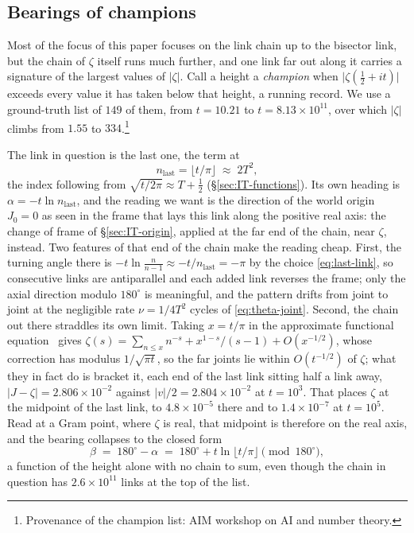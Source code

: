 \documentclass[11pt]{article}
\theoremstyle{definition}
\begin{document}
\subsection{Bearings of champions}\label{sec:champion-bearings}

Most of the focus of this paper focuses on the link chain up to the bisector link, but the chain of $\zeta$ itself runs
much further, and one link far out along it carries a signature of the largest
values of $|\zeta|$. Call a height a \emph{champion} when
$\bigl|\zeta(\tfrac12+it)\bigr|$ exceeds every value it has taken below that
height, a running record. We use a ground-truth list of $149$ of them, from
$t=10.21$ to $t=8.13\times10^{11}$, over which $|\zeta|$ climbs from $1.55$ to
$334$.\footnote{Provenance of the champion list: AIM workshop on AI and
number theory.}

The link in question is the last one, the term at
\begin{equation}\label{eq:last-link}
n_{\text{last}}=\lfloor t/\pi\rfloor\;\approx\;2T^{2},
\end{equation}
the index following from $\sqrt{t/2\pi}\approx T+\tfrac12$
(\S\ref{sec:IT-functions}). Its own
heading is $\alpha=-t\ln n_{\text{last}}$, and the reading we want is the
direction of the world origin $J_{0}=0$ as seen in the frame that lays this link
along the positive real axis: the change of frame of
\S\ref{sec:IT-origin}, applied at the far end of the chain, near $\zeta$,
instead. Two features of that end of the chain make the reading cheap. First, the
turning angle there is $-t\ln\frac{n}{n-1}\approx-t/n_{\text{last}}=-\pi$ by the
choice \eqref{eq:last-link}, so consecutive links are antiparallel and each added
link reverses the frame; only the axial direction modulo $180^{\circ}$ is
meaningful, and the pattern drifts from joint to joint at the negligible rate
$\nu=1/4T^{2}$ cycles of \eqref{eq:theta-joint}. Second, the chain out there
straddles its own limit. Taking $x=t/\pi$ in the approximate functional
equation~\cite[Thm.~4.11]{Titchmarsh1986} gives
$\zeta(s)=\sum_{n\leq x}n^{-s}+x^{1-s}/(s-1)+O(x^{-1/2})$, whose correction has
modulus $1/\sqrt{\pi t}$, so the far joints lie within $O(t^{-1/2})$ of $\zeta$;
what they in fact do is bracket it, each end of the last link sitting half a link
away, $|J-\zeta|=2.806\times10^{-2}$ against $|v|/2=2.804\times10^{-2}$ at
$t=10^{3}$. That places $\zeta$ at the midpoint of the last link, to
$4.8\times10^{-5}$ there and to $1.4\times10^{-7}$ at $t=10^{5}$. Read at a Gram
point, where $\zeta$ is real, that midpoint is therefore on the real axis, and the
bearing collapses to the closed form
\begin{equation}\label{eq:bearing}
\beta\;=\;180^{\circ}-\alpha\;=\;180^{\circ}+t\ln\lfloor t/\pi\rfloor
\pmod{180^{\circ}},
\end{equation}
a function of the height alone with no chain to sum, even though the chain in
question has $2.6\times10^{11}$ links at the top of the list.
\end{document}
